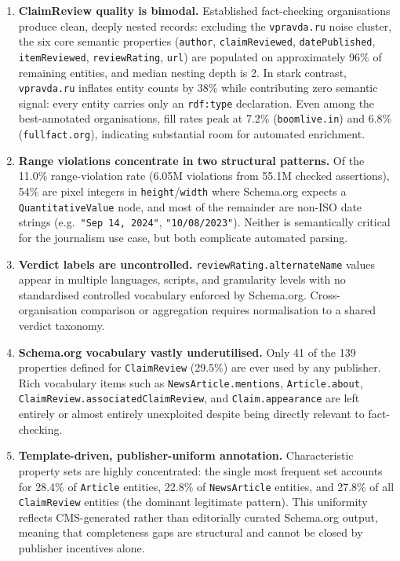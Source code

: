 \documentclass[11pt,a4paper]{article}
\begin{document}
\begin{enumerate}[leftmargin=1.5em]
\item \textbf{ClaimReview quality is bimodal.}
  Established fact-checking organisations produce clean, deeply nested
  records: excluding the \texttt{vpravda.ru} noise cluster, the six core
  semantic properties (\texttt{author}, \texttt{claimReviewed},
  \texttt{datePublished}, \texttt{itemReviewed}, \texttt{reviewRating},
  \texttt{url}) are populated on approximately 96\% of remaining entities,
  and median nesting depth is 2.  In stark contrast, \texttt{vpravda.ru}
  inflates entity counts by 38\% while contributing zero semantic signal:
  every entity carries only an \texttt{rdf:type} declaration.  Even among
  the best-annotated organisations, fill rates peak at 7.2\%
  (\texttt{boomlive.in}) and 6.8\% (\texttt{fullfact.org}),
  indicating substantial room for automated enrichment.

\item \textbf{Range violations concentrate in two structural patterns.}
  Of the 11.0\% range-violation rate (6.05M violations from 55.1M checked
  assertions), 54\% are pixel integers in \texttt{height}/\texttt{width}
  where Schema.org expects a \texttt{QuantitativeValue} node, and most of
  the remainder are non-ISO date strings (e.g.\ \texttt{"Sep 14, 2024"},
  \texttt{"10/08/2023"}).  Neither is semantically critical for the
  journalism use case, but both complicate automated parsing.

\item \textbf{Verdict labels are uncontrolled.}
  \texttt{reviewRating.alternateName} values appear in multiple languages,
  scripts, and granularity levels with no standardised controlled vocabulary
  enforced by Schema.org.  Cross-organisation comparison or aggregation
  requires normalisation to a shared verdict taxonomy.

\item \textbf{Schema.org vocabulary vastly underutilised.}
  Only 41 of the 139 properties defined for \texttt{ClaimReview} (29.5\%)
  are ever used by any publisher.  Rich vocabulary items such as
  \texttt{NewsArticle.mentions}, \texttt{Article.about},
  \texttt{ClaimReview.associatedClaimReview}, and
  \texttt{Claim.appearance} are left entirely or almost entirely
  unexploited despite being directly relevant to fact-checking.

\item \textbf{Template-driven, publisher-uniform annotation.}
  Characteristic property sets are highly concentrated: the single most
  frequent set accounts for 28.4\% of \texttt{Article} entities, 22.8\%
  of \texttt{NewsArticle} entities, and 27.8\% of all \texttt{ClaimReview}
  entities (the dominant legitimate pattern).  This uniformity reflects
  CMS-generated rather than editorially curated Schema.org output, meaning
  that completeness gaps are structural and cannot be closed by publisher
  incentives alone.

\end{enumerate}
\end{document}
